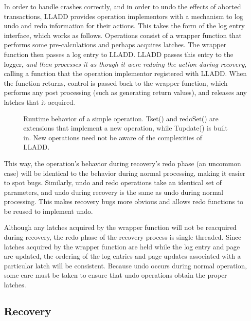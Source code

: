 \documentclass[letterpaper,english]{article}
\begin{document}
\begin{enumerate}
\begin{enumerate}
\begin{enumerate}
In order to handle crashes correctly, and in order to undo the
effects of aborted transactions, LLADD provides operation implementors
with a mechanism to log undo and redo information for their actions.
This takes the form of the log entry interface, which works as follows.
Operations consist of a wrapper function that performs some pre-calculations
and perhaps acquires latches. The wrapper function then passes a log
entry to LLADD. LLADD passes this entry to the logger, {\em and then processes
it as though it were redoing the action during recovery}, calling a function
that the operation implementor registered with
LLADD. When the function returns, control is passed back to the wrapper
function, which performs any post processing (such as generating return
values), and releases any latches that it acquired. %
\begin{figure}

\caption{\label{cap:Tset}Runtime behavior of a simple operation. Tset() and redoSet() are
extensions that implement a new operation, while Tupdate() is built in. New operations
need not be aware of the complexities of LLADD.}
\end{figure}


This way, the operation's behavior during recovery's redo phase (an
uncommon case) will be identical to the behavior during normal processing,
making it easier to spot bugs. Similarly, undo and redo operations take
an identical set of parameters, and undo during recovery is the same 
as undo during normal processing.  This makes recovery bugs more obvious and allows redo
functions to be reused to implement undo. 

Although any latches acquired by the wrapper function will not be
reacquired during recovery, the redo phase of the recovery process
is single threaded. Since latches acquired by the wrapper function
are held while the log entry and page are updated, the ordering of
the log entries and page updates associated with a particular latch
will be consistent. Because undo occurs during normal operation, 
some care must be taken to ensure that undo operations obtain the 
proper latches.


\subsection{Recovery}


\end{enumerate}
\end{enumerate}
\end{enumerate}
\end{document}
